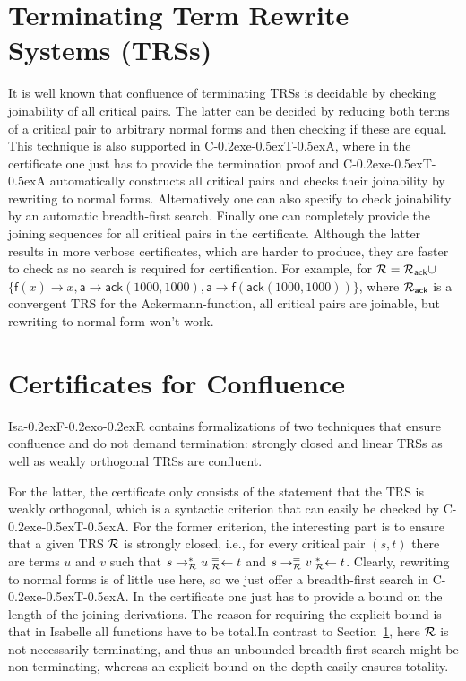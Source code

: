 \documentclass[a4paper]{easychair}
\newcommand\isafor{\textsf{Isa\kern-0.2exF\kern-0.2exo\kern-0.2exR}\xspace}
\newcommand\ceta{\textsf{C\kern-0.2exe\kern-0.5exT\kern-0.5exA}\xspace}
\newcommand\RR{{\cal R}}
\newcommand\m[1]{\mathsf{#1}}
\newcommand{\from}{\leftarrow}
\newcommand{\fromBT}[2]{\mathrel{{\vphantom{\to}^{#1}_{#2}}{\from}}}
\newcommand\rSC[1]{Section~\ref{sect:#1}}
\begin{document}
\section{Terminating Term Rewrite Systems (TRSs)}
\label{sect:terminating}
It is well known that confluence of terminating TRSs is decidable by checking
joinability of all critical pairs. The latter can be decided by reducing both terms of
a critical pair to arbitrary normal forms and then checking if these are equal.
This technique is also supported in \ceta, where in the certificate one just has to 
provide the termination
proof and \ceta automatically constructs all critical pairs and checks their joinability by
rewriting to normal forms. 
Alternatively one can also specify to check joinability by an automatic breadth-first search. 
Finally one can completely provide the joining sequences for all critical pairs in the certificate. 
Although the latter results in more verbose certificates, which are harder to produce,
they are faster to check as no search is required for certification.
For example, for $\RR = \RR_{\m{ack}} \cup $ $\{\m f(x) \to
  x, \m a \to \m{ack}(1000,1000), \m a \to \m f(\m{ack}(1000,1000))\}$, where $\RR_{\m{ack}}$
  is a convergent TRS for the Ackermann-function, all critical pairs are joinable, 
  but rewriting to normal form won't work.
  


\section{Certificates for Confluence}
\isafor contains formalizations of two techniques
that ensure confluence and do not demand termination: strongly closed and linear TRSs as well as weakly orthogonal TRSs 
are confluent.

For the latter, the certificate only consists of the statement that the TRS is weakly
orthogonal, which is a syntactic criterion that can easily be checked by \ceta. 
For the former criterion, the interesting part is to ensure that a given TRS $\RR$ is strongly closed,
i.e., for every critical pair $(s,t)$ there are terms $u$ and $v$ such that 
$s \to^*_\RR u \fromBT{=}{\RR} t$ and $s \to^=_\RR v \fromBT{*}{\RR} t$. Clearly,
rewriting to normal forms is of little use here, so we just offer a breadth-first search
in \ceta. In the certificate one just has to provide a bound on the length of the joining
derivations. The reason for requiring the explicit bound is that
in Isabelle all functions have to be total.\pagebreak In contrast to \rSC{terminating},
here $\RR$ is not necessarily terminating,
and thus an unbounded breadth-first search might be non-terminating, whereas an explicit bound on the
depth easily ensures totality.
\end{document}
